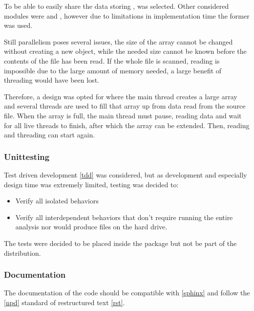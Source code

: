 \documentclass[letterpaper,10pt,english]{sphinxmanual}
\begin{document}
To be able to easily share the data storing ,  was
selected. Other considered modules were  and ,
however due to limitations in implementation time the former was used.

Still parallelism poses several issues, the size of the array cannot be
changed without creating a new object, while the needed size cannot be known
before the contents of the file has been read.
If the whole file is scanned, reading is impossible due to the large amount of
memory needed, a large benefit of threading would have been lost.

Therefore, a design was opted for where the main thread creates a large array
and several threads are used to fill that array up from data read from the
source file.
When the array is full, the main thread must pause, reading data and wait for
all live threads to finish, after which the array can be extended.
Then, reading and threading can start again.


\subsubsection{Unittesting}
\label{c3se_python_course:unittesting}
Test driven development {\hyperref[c3se_python_course:tdd]{{[}tdd{]}}} was considered, but as development and
especially design time was extremely limited, testing was decided to:
\begin{itemize}
\item {} 
Verify all isolated behaviors

\item {} 
Verify all interdependent behaviors that don't require running the
entire analysis nor would produce files on the hard drive.

\end{itemize}

The tests were decided to be placed inside the package but not be part
of the distribution.


\subsubsection{Documentation}
\label{c3se_python_course:documentation}
The documentation of the code should be compatible with  {\hyperref[c3se_python_course:sphinx]{{[}sphinx{]}}}
and follow the  {\hyperref[c3se_python_course:npd]{{[}npd{]}}} standard of restructured text {\hyperref[c3se_python_course:rst]{{[}rst{]}}}.
\end{document}
